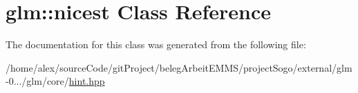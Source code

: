 \hypertarget{classglm_1_1nicest}{\section{glm\-:\-:nicest Class Reference}
\label{classglm_1_1nicest}
}


The documentation for this class was generated from the following file\-:\begin{DoxyCompactItemize}
\item 
/home/alex/source\-Code/git\-Project/beleg\-Arbeit\-E\-M\-M\-S/project\-Sogo/external/glm-\/0.../glm/core/\hyperlink{hint_8hpp}{hint.\-hpp}\end{DoxyCompactItemize}
